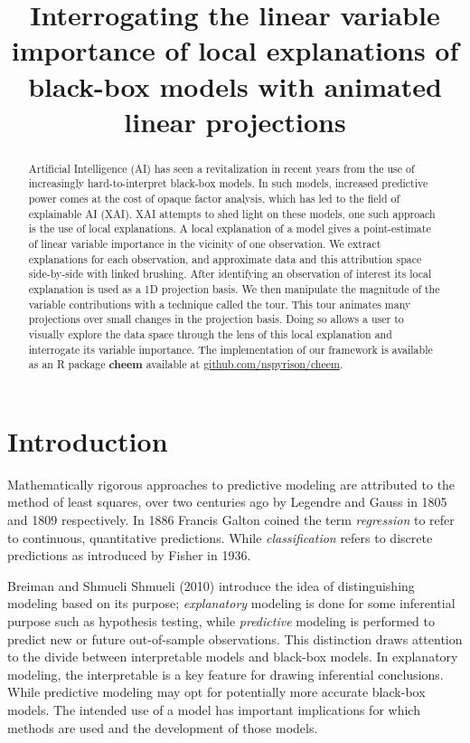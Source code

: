 \documentclass[
]{article}
\title{Interrogating the linear variable importance of local explanations of black-box models with animated linear projections}
\author{}
\date{\vspace{-2.5em}}
\begin{document}
\maketitle
\begin{abstract}
Artificial Intelligence (AI) has seen a revitalization in recent years from the use of increasingly hard-to-interpret black-box models. In such models, increased predictive power comes at the cost of opaque factor analysis, which has led to the field of explainable AI (XAI). XAI attempts to shed light on these models, one such approach is the use of local explanations. A local explanation of a model gives a point-estimate of linear variable importance in the vicinity of one observation. We extract explanations for each observation, and approximate data and this attribution space side-by-side with linked brushing. After identifying an observation of interest its local explanation is used as a 1D projection basis. We then manipulate the magnitude of the variable contributions with a technique called the tour. This tour animates many projections over small changes in the projection basis. Doing so allows a user to visually explore the data space through the lens of this local explanation and interrogate its variable importance. The implementation of our framework is available as an R package \textbf{cheem} available at \href{https://github.com/nspyrison/cheem}{github.com/nspyrison/cheem}.
\end{abstract}

\hypertarget{sec:intro}{%
\section{Introduction}\label{sec:intro}}

Mathematically rigorous approaches to predictive modeling are attributed to the method of least squares, over two centuries ago by Legendre and Gauss in 1805 and 1809 respectively. In 1886 Francis Galton coined the term \emph{regression} to refer to continuous, quantitative predictions. While \emph{classification} refers to discrete predictions as introduced by Fisher in 1936.

Breiman and Shmueli Shmueli (2010) introduce the idea of distinguishing modeling based on its purpose; \emph{explanatory} modeling is done for some inferential purpose such as hypothesis testing, while \emph{predictive} modeling is performed to predict new or future out-of-sample observations. This distinction draws attention to the divide between interpretable models and black-box models. In explanatory modeling, the interpretable is a key feature for drawing inferential conclusions. While predictive modeling may opt for potentially more accurate black-box models. The intended use of a model has important implications for which methods are used and the development of those models.
\end{document}

